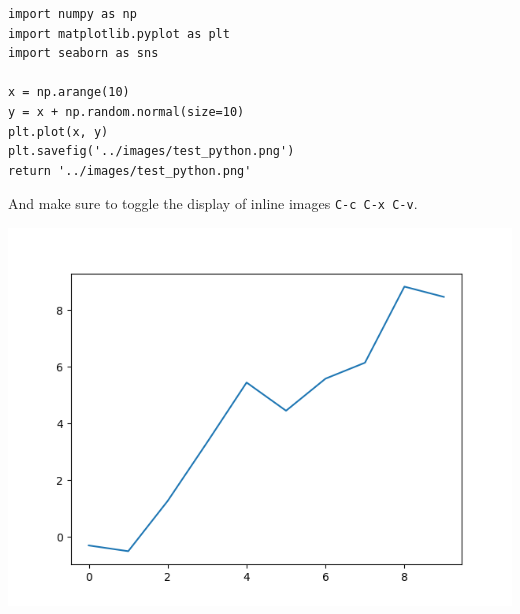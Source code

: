 \documentclass[11pt]{article}
\author{Victor Trappler}
\date{\today}
\title{}
\begin{document}
\begin{verbatim}
import numpy as np
import matplotlib.pyplot as plt
import seaborn as sns

x = np.arange(10)
y = x + np.random.normal(size=10)
plt.plot(x, y)
plt.savefig('../images/test_python.png')
return '../images/test_python.png' 
\end{verbatim}
And make sure to toggle the display of inline images \texttt{C-c C-x C-v}.
\begin{center}
\includegraphics[width=.9\linewidth]{../images/test_python.png}
\end{center}
\end{document}
